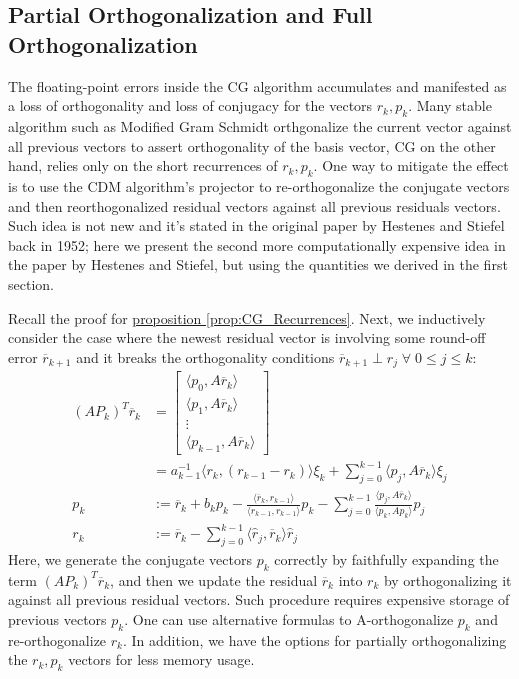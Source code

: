 \documentclass[]{article}
\theoremstyle{definition}
\begin{document}
    \subsection{Partial Orthogonalization and Full Orthogonalization}
        The floating-point errors inside the CG algorithm accumulates and manifested as a loss of orthogonality and loss of conjugacy for the vectors $r_k, p_k$. Many stable algorithm such as Modified Gram Schmidt orthgonalize the current vector against all previous vectors to assert orthogonality of the basis vector, CG on the other hand, relies only on the short recurrences of $r_k, p_k$. One way to mitigate the effect is to use the CDM algorithm's projector to re-orthogonalize the conjugate vectors and then reorthogonalized residual vectors against all previous residuals vectors. Such idea is not new and it's stated in the original paper by Hestenes and Stiefel back in 1952\cite{paper:cg_original}; here we present the second more computationally expensive idea in the paper by Hestenes and Stiefel, but using the quantities we derived in the first section. 
        \par
        Recall the proof for \hyperref[prop:CG_Recurrences]{proposition \ref*{prop:CG_Recurrences}}. Next, we inductively consider the case where the newest residual vector is involving some round-off error $\overline{r}_{k + 1}$ and it breaks the orthogonality conditions $\overline{r}_{k + 1} \perp r_{j} \; \forall \; 0 \le j \le k$: 
        \begin{align}
            (AP_k)^T\overline{r}_k &= 
            \begin{bmatrix}
                \langle p_0, A\overline{r}_k\rangle
                \\
                \langle p_1, A\overline{r}_k\rangle
                \\
                \vdots
                \\
                \langle p_{k - 1}, A\overline{r}_k\rangle
            \end{bmatrix}
            \\
            & = 
            a_{k - 1}^{-1}\langle r_k, (r_{k - 1} - r_k)\rangle\xi_k + \sum_{j = 0}^{k - 1}\langle p_j, A\overline{r}_k\rangle \xi_j
            \\
            p_k &:= \overline{r}_k + b_kp_k - 
                \frac{\langle \overline{r}_k, r_{k -1}\rangle}{\langle r_{k - 1}, r_{k - 1}\rangle}p_k
            - \sum_{j = 0}^{k - 1}\frac{\langle p_j, A\overline{r}_k\rangle}{\langle p_k, Ap_k\rangle}p_j
            \\
            r_k &:= \overline{r}_k - \sum_{j = 0}^{k - 1} \langle \hat{r}_j,\overline{r}_k\rangle \hat{r}_j
        \end{align}
        Here, we generate the conjugate vectors $p_k$ correctly by faithfully expanding the term $(AP_k)^T\overline{r}_k$, and then we update the residual $\overline{r}_k$ into $r_k$ by orthogonalizing it against all previous residual vectors. Such procedure requires expensive storage of previous vectors $p_k$. One can use alternative formulas to A-orthogonalize $p_k$ and re-orthogonalize $r_k$. In addition, we have the options for partially orthogonalizing the $r_k, p_k$ vectors for less memory usage. 
\end{document}
